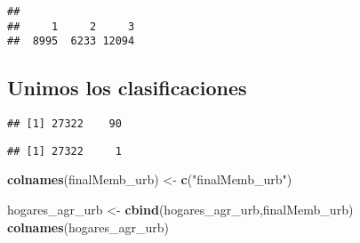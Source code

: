 \documentclass[11pt,]{article}
\newenvironment{Shaded}{\begin{snugshade}}{\end{snugshade}}
\newcommand{\KeywordTok}[1]{\textcolor[rgb]{0.13,0.29,0.53}{\textbf{#1}}}
\newcommand{\DecValTok}[1]{\textcolor[rgb]{0.00,0.00,0.81}{#1}}
\newcommand{\StringTok}[1]{\textcolor[rgb]{0.31,0.60,0.02}{#1}}
\newcommand{\OperatorTok}[1]{\textcolor[rgb]{0.81,0.36,0.00}{\textbf{#1}}}
\newcommand{\NormalTok}[1]{#1}
\begin{document}
\begin{Shaded}
\end{Shaded}

\begin{verbatim}
## 
##     1     2     3 
##  8995  6233 12094
\end{verbatim}

\subsection{Unimos los
clasificaciones}\label{unimos-los-clasificaciones-1}

\begin{Shaded}
\end{Shaded}

\begin{verbatim}
## [1] 27322    90
\end{verbatim}

\begin{Shaded}
\end{Shaded}

\begin{verbatim}
## [1] 27322     1
\end{verbatim}

\begin{Shaded}
\begin{Highlighting}[]
\KeywordTok{colnames}\NormalTok{(finalMemb_urb) <-}\StringTok{ }\KeywordTok{c}\NormalTok{(}\StringTok{"finalMemb_urb"}\NormalTok{) }

\NormalTok{hogares_agr_urb <-}\StringTok{ }\KeywordTok{cbind}\NormalTok{(hogares_agr_urb,finalMemb_urb)}
\KeywordTok{colnames}\NormalTok{(hogares_agr_urb)}
\end{Highlighting}
\end{Shaded}
\end{document}
